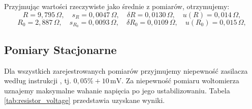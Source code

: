 \documentclass[12pt]{article}
\begin{document}
Przyjmując wartości rzeczywiste jako średnie z pomiarów, otrzymujemy:
\[
    R = 9{,}795\,\Omega, \quad s_{R} = 0{,}0047\,\Omega, \quad \delta R = 0{,}0130\,\Omega, \quad u(R) = 0{,}014\,\Omega,
\]
\[
    R_0 = 2{,}887\,\Omega, \quad s_{R_0} = 0{,}0093\,\Omega, \quad \delta R_0 = 0{,}0109\,\Omega, \quad u(R_0) = 0{,}015\,\Omega,
\]

\newpage

\subsection{Pomiary Stacjonarne}
Dla wszystkich zarejestrowanych pomiarów przyjmujemy niepewność zasilacza według instrukcji \cite{generator}, tj. $0{,}05\% + 10\,\mathrm{mV}$.  
Za niepewność pomiaru woltomierza uznajemy maksymalne wahanie napięcia po jego ustabilizowaniu. Tabela \ref{tab:resistor_voltage} przedstawia uzyskane wyniki.
\end{document}
